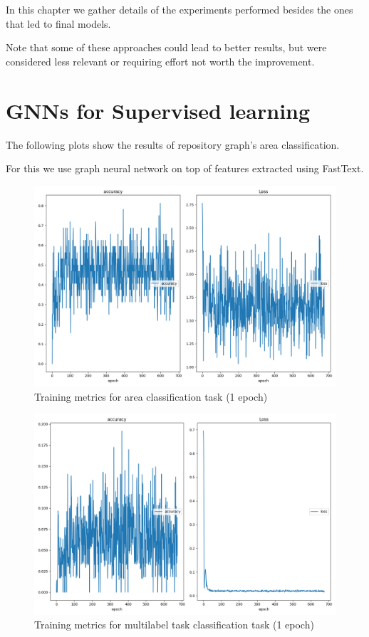 \documentclass[11pt]{report}
\begin{document}
In this chapter we gather details of the experiments performed besides the ones
that led to final models.

Note that some of these approaches could lead to better results, but were
considered less relevant or requiring effort not worth the improvement.


\section{GNNs for Supervised learning}
\label{supervised_learning}

The following plots show the results of repository graph's area classification.

For this we use graph neural network on top of features extracted using FastText.

\begin{figure}[htbp]
  \centering
  \includegraphics[width=.9\linewidth]{./img/graph_nn_area_training_losses.png}
  \caption{Training metrics for area classification task (1 epoch)}
\end{figure}


\begin{figure}[htbp]
  \centering
  \includegraphics[width=.9\linewidth]{./img/graph_nn_task_training_losses.png}
  \caption{Training metrics for multilabel task classification task (1 epoch)}
\end{figure}
\end{document}

